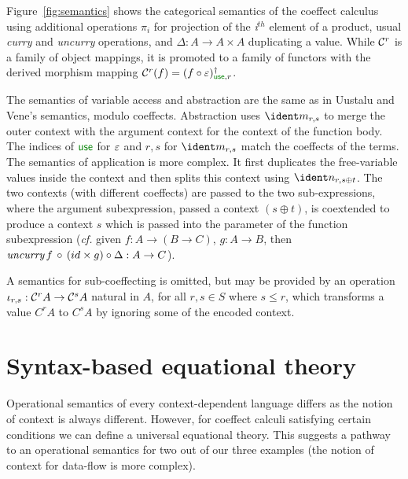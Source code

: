 Figure~\ref{fig:semantics} shows the
categorical semantics of the coeffect calculus
using additional operations 
$\pi_i$ for projection of the \emph{i}$^{th}$ element of a 
product, usual
\emph{curry} and \emph{uncurry} operations, and
 $\Delta : A \rightarrow A \times A$ duplicating a
value. While $\mathcal{C}^{r}$ is a family of object mappings,
it is promoted to a family of functors with the derived morphism mapping 
$\ccat^{r}(f) = \cobind{ (f \circ \counit) }{\cunit, r}$.

The semantics of variable access and abstraction are the same as in
Uustalu and Vene's semantics, modulo coeffects. Abstraction uses $\cmerge_{r, s}$ to merge the outer
context with the argument context for the context of the function body.
The indices of $\cunit$ for
$\varepsilon$ and $r,s$ for $\cmerge_{r, s}$ match the coeffects
of the terms.
The semantics of application is more complex. It first duplicates the
free-variable values inside the context and then splits this context
using $\csplit_{r, {s \oplus t}}$. The two contexts (with
different coeffects) are passed to the two sub-expressions,
where the argument subexpression, passed a context $(s \oplus t)$,
is coextended to produce a context $s$ which is passed into
the parameter of the function subexpression (\emph{cf.} given $f : A \rightarrow (B \rightarrow C)$,
 $g : A \rightarrow B$, then $\emph{uncurry} \, f \, \circ \, (id \times g) \circ \Delta : A \rightarrow C$).

A semantics for sub-coeffecting is omitted, but may be provided
by an operation 
$\iota_{r, s} : \mathcal{C}^r A \rightarrow \mathcal{C}^s A$ natural in $A$, for all $r, s \in S$ where $s \leq r$,
which transforms a value $C^r A$ to $C^s A$ by
ignoring some of the encoded context.


\section{Syntax-based equational theory}
\label{sec:syntactic}

Operational semantics of every context-dependent language differs as the notion of context 
is always different. However, for coeffect calculi satisfying certain conditions we can 
define a universal equational theory. This suggests a pathway to an operational semantics for 
two out of our three examples (the notion of context for data-flow is more complex).

